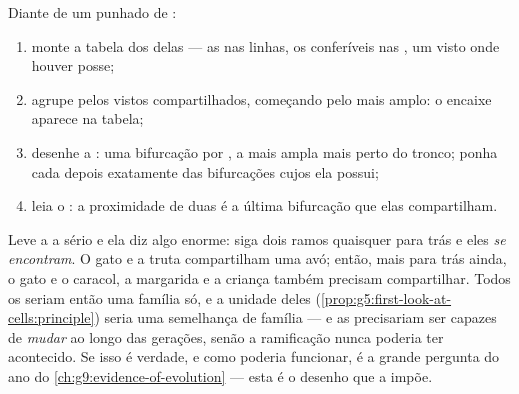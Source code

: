 \begin{method}\label{met:g6:classification-kinship:build}
Diante de um punhado de :
\begin{enumerate}
  \item monte a tabela dos  delas --- as  nas
        linhas, os  conferíveis nas , um visto onde
        houver posse;
  \item agrupe pelos vistos compartilhados, começando pelo 
        mais amplo: o encaixe aparece na tabela;
  \item desenhe a : uma bifurcação por , a mais ampla
        mais perto do tronco; ponha cada  depois exatamente
        das bifurcações cujos  ela possui;
  \item leia o : a proximidade de duas  é a última
        bifurcação que elas compartilham.
\end{enumerate}
\end{method}

\begin{remark}\label{rem:g6:classification-kinship:implies}
Leve a  a sério e ela diz algo enorme: siga dois ramos quaisquer
para trás e eles \emph{se encontram}. O gato e a truta compartilham
uma  avó; então, mais para trás ainda, o gato e o caracol, a
margarida e a criança também precisam compartilhar. Todos os  seriam então uma família só, e a unidade deles
(\cref{prop:g5:first-look-at-cells:principle}) seria uma semelhança de
família --- e as  precisariam ser capazes de \emph{mudar} ao
longo das gerações, senão a ramificação nunca poderia ter acontecido.
Se isso é verdade, e como poderia funcionar, é a grande pergunta do
ano do \cref{ch:g9:evidence-of-evolution} --- esta  é o desenho
que a impõe.
\end{remark}

